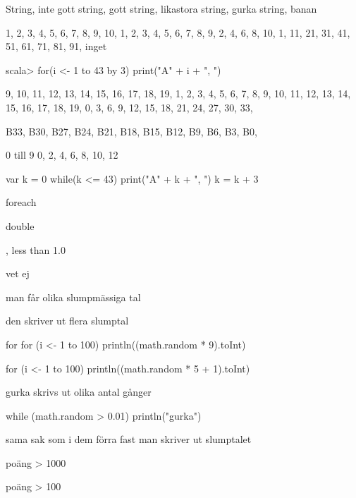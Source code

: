 \Task %

\Subtask String, inte gott
\Subtask string, gott
\Subtask string, likastora
\Subtask string, gurka
\Subtask string, banan

\Task %

\Subtask 

1, 2, 3, 4, 5, 6, 7, 8, 9, 10,
1, 2, 3, 4, 5, 6, 7, 8, 9,
2, 4, 6, 8, 10,
1, 11, 21, 31, 41, 51, 61, 71, 81, 91,
inget

\Subtask 

scala> for(i <- 1 to 43 by 3) print("A" + i + ", ")

\Task %

\Subtask 

9, 10, 11, 12, 13, 14, 15, 16, 17, 18, 19,
1, 2, 3, 4, 5, 6, 7, 8, 9, 10, 11, 12, 13, 14, 15, 16, 17, 18, 19,
0, 3, 6, 9, 12, 15, 18, 21, 24, 27, 30, 33,

\Subtask 

B33, B30, B27, B24, B21, B18, B15, B12, B9, B6, B3, B0,

\Task %

\Subtask 

0 till 9
0, 2, 4, 6, 8, 10, 12

\Subtask 

var k = 0
while(k <= 43)
{
print("A" + k + ", ")
k = k + 3
}

\Subtask 

foreach

\Task %

\Subtask  double

, less than 1.0

\Subtask  vet ej

\Subtask man får olika slumpmässiga tal

\Subtask den skriver ut flera slumptal

\Subtask for for (i <- 1 to 100) println((math.random * 9).toInt)

\Subtask for (i <- 1 to 100) println((math.random * 5 + 1).toInt)

\Subtask  gurka skrivs ut olika antal gånger

\Subtask while (math.random > 0.01) println("gurka")

\Subtask  sama sak som i dem förra fast man skriver ut slumptalet

\Task %

\Subtask  poäng > 1000

\Subtask poäng > 100

